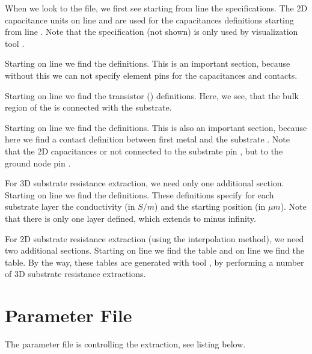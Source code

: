 \normalsize
When we look to the file, we first see starting from line  the  specifications.
The 2D capacitance units on line  and  are used for the capacitances definitions
starting from line .
Note that the  specification (not shown) is only used by visualization tool .

Starting on line  we find the  definitions.
This is an important section, because without this we can not specify
element pins for the capacitances and contacts.

Starting on line  we find the transistor () definitions.
Here, we see, that the bulk region of the  is connected with the substrate.

Starting on line  we find the  definitions.
This is also an important section,
because here we find a contact definition between first metal  and the substrate .
Note that the 2D capacitances or not connected to the substrate pin ,
but to the ground node pin .

For 3D substrate resistance extraction, we need only one additional section.
Starting on line  we find the  definitions.
These definitions specify for each substrate layer the conductivity (in $S / m$)
and the starting position (in $\mu m$).
Note that there is only one layer defined, which extends to minus infinity.

For 2D substrate resistance extraction (using the interpolation method), we need two additional sections.
Starting on line  we find the  table
and on line  we find the  table.
By the way, these tables are generated with tool ,
by performing a number of 3D substrate resistance extractions.
\newpage
\section{Parameter File}
\label{SOparam}
The parameter file  is controlling the extraction, see listing below.


